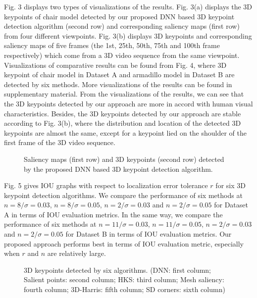\documentclass[runningheads]{article}
\begin{document}
Fig. 3 displays two types of visualizations of the results. Fig. 3(a) displays the 3D keypoints of chair model detected by our proposed DNN based 3D keypoint detection algorithm (second row) and corresponding saliency maps (first row) from four different viewpoints. Fig. 3(b) displays 3D keypoints and corresponding saliency maps of five frames (the 1st, 25th, 50th, 75th and 100th frame respectively) which come from a 3D video sequence \cite{3Dsequence} from the same viewpoint. Visualizations of comparative results can be found from Fig. 4, where 3D keypoint of chair model in Dataset A and armadillo model in Dataset B are detected by six methods. More visualizations of the results can be found in supplementary material. From the visualizations of the results, we can see that the 3D keypoints detected by our approach are more in accord with human visual characteristics. Besides, the 3D keypoints detected by our approach are stable according to Fig. 3(b), where the distribution and location of the detected 3D keypoints are almost the same, except for a keypoint lied on the shoulder of the first frame of the 3D video sequence.

\begin{figure}[tbp]
	\centering
	\caption{Saliency maps (first row) and 3D keypoints (second row) detected by the proposed DNN based 3D keypoint detection algorithm.}
\end{figure}

Fig. 5 gives IOU graphs with respect to localization error tolerance \emph{$r$} for six 3D keypoint detection algorithms. We compare the performance of six methods at \emph{$n=8/\sigma=0.03$}, \emph{$n=8/\sigma=0.05$}, \emph{$n=2/\sigma=0.03$} and \emph{$n=2/\sigma=0.05$} for Dataset A in terms of IOU evaluation metrics. In the same way, we compare the performance of six methods at \emph{$n=11/\sigma=0.03$}, \emph{$n=11/\sigma=0.05$}, \emph{$n=2/\sigma=0.03$} and \emph{$n=2/\sigma=0.05$} for Dataset B in terms of IOU evaluation metrics. Our proposed approach performs best in terms of IOU evaluation metric, especially when \emph{$r$} and \emph{$n$} are relatively large.

\begin{figure}[!htb]
	\centering
	\begin{minipage}[b]{1\linewidth}
		\caption{3D keypoints detected by six algorithms. (DNN: first column; Salient points: second column; HKS: third column; Mesh saliency: fourth column; 3D-Harris: fifth column; SD corners: sixth column)}
	\end{minipage}
\end{figure}
\end{document}
